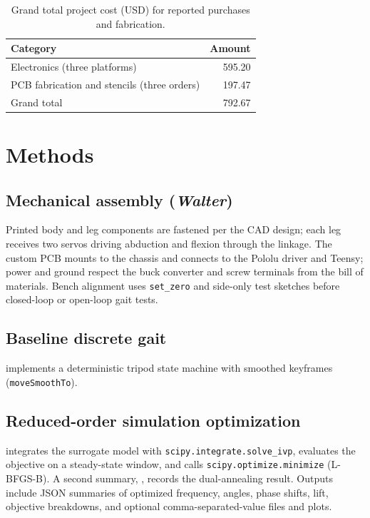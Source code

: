 \documentclass[11pt]{article}
\begin{document}
\begin{table}[htbp]
  \centering
  \caption{Grand total project cost (USD) for reported purchases and fabrication.}
  \label{tab:grand}
  \begin{tabular}{@{}lr@{}}
    \toprule
    Category & Amount \\
    \midrule
    Electronics (three platforms) & 595.20 \\
    PCB fabrication and stencils (three orders) & 197.47 \\
    \midrule
    Grand total & 792.67 \\
    \bottomrule
  \end{tabular}
\end{table}

\section{Methods}

\subsection{Mechanical assembly (\emph{Walter})}
Printed body and leg components are fastened per the CAD design; each leg receives two servos driving abduction and flexion through the linkage. The custom PCB mounts to the chassis and connects to the Pololu driver and Teensy; power and ground respect the buck converter and screw terminals from the bill of materials. Bench alignment uses \texttt{set\_zero} and side-only test sketches before closed-loop or open-loop gait tests.

\subsection{Baseline discrete gait}
 implements a deterministic tripod state machine with smoothed keyframes (\texttt{moveSmoothTo}).

\subsection{Reduced-order simulation optimization}
 integrates the surrogate model with \texttt{scipy.integrate.solve\_ivp}, evaluates the objective on a steady-state window, and calls \texttt{scipy.optimize.minimize} (L-BFGS-B). A second summary, , records the dual-annealing result. Outputs include JSON summaries of optimized frequency, angles, phase shifts, lift, objective breakdowns, and optional comma-separated-value files and plots.
\end{document}
